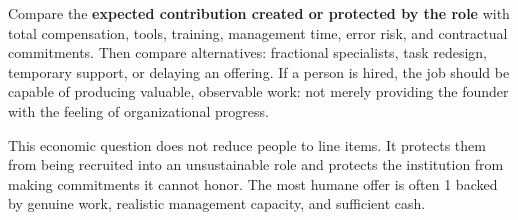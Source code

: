 Compare the \textbf{expected contribution created or protected by the role} with total compensation, tools, training, management time, error risk, and contractual commitments. Then compare alternatives: fractional specialists, task redesign, temporary support, or delaying an offering. If a person is hired, the job should be capable of producing valuable, observable work: not merely providing the founder with the feeling of organizational progress.

This economic question does not reduce people to line items. It protects them from being recruited into an unsustainable role and protects the institution from making commitments it cannot honor. The most humane offer is often 1 backed by genuine work, realistic management capacity, and sufficient cash.
